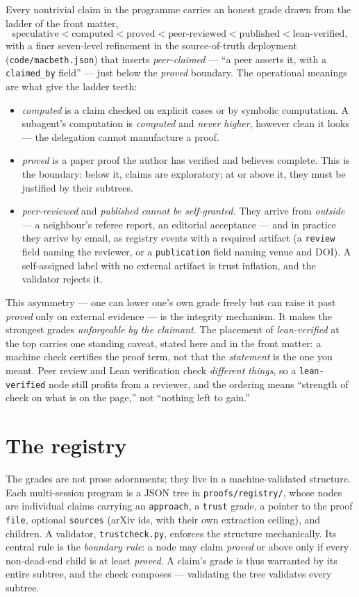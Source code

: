 \documentclass[11pt]{report}
\theoremstyle{plain}
\theoremstyle{definition}
\theoremstyle{remark}
\begin{document}
Every nontrivial claim in the programme carries an honest grade drawn from the
ladder of the front matter,
\[
   \text{speculative} < \text{computed} < \text{proved}
   < \text{peer-reviewed} < \text{published} < \text{lean-verified},
\]
with a finer seven-level refinement in the source-of-truth deployment
(\texttt{code/macbeth.json}) that inserts \emph{peer-claimed} --- ``a peer asserts
it, with a \texttt{claimed\_by} field'' --- just below the \emph{proved} boundary.
The operational meanings are what give the ladder teeth:
\begin{itemize}
\item \emph{computed} is a claim checked on explicit cases or by symbolic
computation. A subagent's computation is \emph{computed} and \emph{never higher},
however clean it looks --- the delegation cannot manufacture a proof.
\item \emph{proved} is a paper proof the author has verified and believes
complete. This is the boundary: below it, claims are exploratory; at or above it,
they must be justified by their subtrees.
\item \emph{peer-reviewed} and \emph{published} \emph{cannot be self-granted.}
They arrive from \emph{outside} --- a neighbour's referee report, an editorial
acceptance --- and in practice they arrive by email, as registry events with a
required artifact (a \texttt{review} field naming the reviewer, or a
\texttt{publication} field naming venue and DOI). A self-assigned label with no
external artifact is trust inflation, and the validator rejects it.
\end{itemize}
This asymmetry --- one can lower one's own grade freely but can raise it past
\emph{proved} only on external evidence --- is the integrity mechanism. It makes
the strongest grades \emph{unforgeable by the claimant}. The placement of
\emph{lean-verified} at the top carries one standing caveat, stated here and in
the front matter: a machine check certifies the proof term, not that the
\emph{statement} is the one you meant. Peer review and Lean verification check
\emph{different things}, so a \texttt{lean-verified} node still profits from a
reviewer, and the ordering means ``strength of check on what is on the page,''
not ``nothing left to gain.''

\section{The registry}\label{sec:pipeline-registry}

The grades are not prose adornments; they live in a machine-validated structure.
Each multi-session program is a JSON tree in \texttt{proofs/registry/}, whose
nodes are individual claims carrying an \texttt{approach}, a \texttt{trust} grade,
a pointer to the proof \texttt{file}, optional \texttt{sources} (arXiv ids, with
their own extraction ceiling), and children. A validator, \texttt{trustcheck.py},
enforces the structure mechanically. Its central rule is the \emph{boundary rule}:
a node may claim \emph{proved} or above only if every non-dead-end child is at
least \emph{proved}. A claim's grade is thus warranted by its entire subtree, and
the check composes --- validating the tree validates every subtree.
\end{document}
